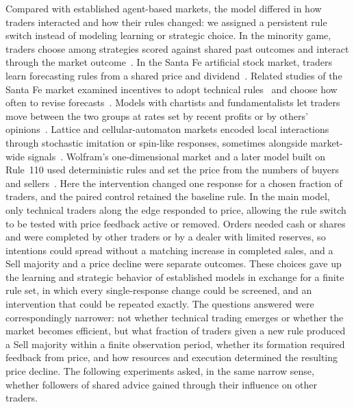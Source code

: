Compared with established agent-based markets, the model differed in
how traders interacted and how their rules changed: we assigned a
persistent rule switch instead of modeling learning or strategic
choice. In the minority
game, traders choose among strategies scored against shared past outcomes
and interact through the market outcome~\cite{challet1997minority,challet2000modeling}.
In the Santa Fe artificial stock market, traders learn forecasting rules
from a shared price and dividend~\cite{lebaron1999time}. Related studies of the Santa Fe market examined incentives to adopt technical
rules~\cite{joshi1999technical} and choose how often to revise
forecasts~\cite{joshi2002financial}.
Models with chartists and fundamentalists let traders move between the
two groups at rates set by recent profits or by others'
opinions~\cite{lux1999scaling,brock1998heterogeneous,kirman1993ants}.
Lattice and cellular-automaton markets encoded local interactions
through stochastic imitation or spin-like responses, sometimes alongside
market-wide
signals~\cite{bornholdt2001ising,iori2002microsimulation,bartolozzi2004stochastic,qiu2007cellular,sornette2006importance,fan2009effect,atman2012influence}.
Wolfram's one-dimensional market and a later model built on Rule~110
used deterministic rules and set the price from the numbers of buyers
and sellers~\cite{wolfram2002new,valsan2022on}. Here the intervention
changed one response for a chosen fraction of traders, and the paired
control retained the baseline rule. In the main model, only technical
traders along the edge responded to price, allowing the rule switch to
be tested with
price feedback active or removed. Orders needed cash or shares and were
completed by other traders or by a dealer with limited reserves, so
intentions could spread without a matching increase in completed sales,
and a Sell majority and a price decline were separate outcomes. These
choices gave up the learning and strategic behavior of established
models in exchange for a finite rule set, in which every single-response
change could be screened, and an intervention that could be repeated
exactly. The questions answered were correspondingly narrower: not
whether technical trading emerges or whether the market becomes
efficient, but what fraction of traders given a new rule produced a Sell
majority within a finite observation period, whether its formation
required feedback from price, and how resources and execution determined
the resulting price decline. The following experiments asked, in the same
narrow sense, whether followers of shared advice gained through their
influence on other traders.

